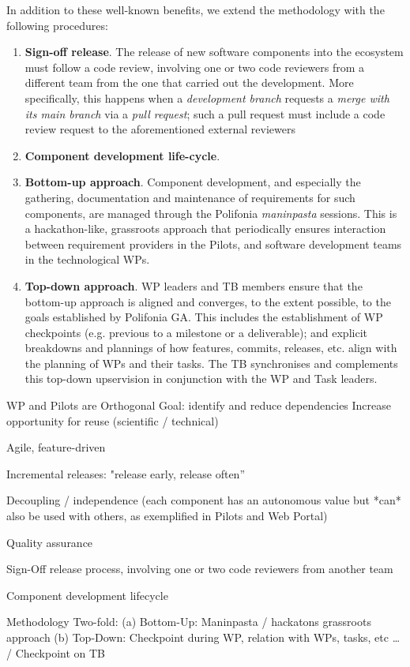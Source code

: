 In addition to these well-known benefits, we extend the methodology with the following procedures:

\begin{enumerate}
    \item \textbf{Sign-off release}. The release of new software components into the ecosystem must follow a code review, involving one or two code reviewers from a different team from the one that carried out the development. More specifically, this happens when a \emph{development branch} requests a \emph{merge with its main branch} via a \emph{pull request}; such a pull request must include a code review request to the aforementioned external reviewers 
    \item \textbf{Component development life-cycle}.
    \item \textbf{Bottom-up approach}. Component development, and especially the gathering, documentation and maintenance of requirements for such components, are managed through the Polifonia \emph{maninpasta} sessions. This is a hackathon-like, grassroots approach that periodically ensures interaction between requirement providers in the Pilots, and software development teams in the technological WPs.
    \item \textbf{Top-down approach}. WP leaders and TB members ensure that the bottom-up approach is aligned and converges, to the extent possible, to the goals established by Polifonia GA. This includes the establishment of WP checkpoints (e.g. previous to a milestone or a deliverable); and explicit breakdowns and plannings of how features, commits, releases, etc. align with the planning of WPs and their tasks. The TB synchronises and complements this top-down upservision in conjunction with the WP and Task leaders.
\end{enumerate}

WP and Pilots are Orthogonal 
Goal: identify and reduce dependencies 
Increase opportunity for reuse (scientific / technical) 

Agile, feature-driven 

Incremental releases: "release early, release often” 

Decoupling / independence (each component has an autonomous value but *can* also be used with others, as exemplified in Pilots and Web Portal) 

Quality assurance 

Sign-Off release process, involving one or two code reviewers from another team 

Component development lifecycle 

Methodology Two-fold: 
(a) Bottom-Up: Maninpasta / hackatons grassroots approach 
(b) Top-Down: Checkpoint during WP, relation with WPs, tasks, etc … / Checkpoint on TB 